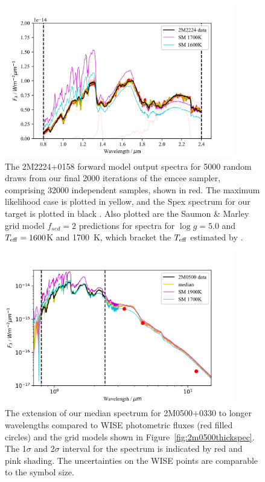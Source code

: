 \documentclass[useAMS,usenatbib]{mn2e}
\begin{document}
\begin{figure}
\hspace{-0.8cm}\includegraphics[width=285pt]{2M2224_spag_spec_ucl.png}
\caption{ The 2M2224+0158 forward model output spectra for 5000 random draws from our final 2000 iterations of the {\sc emcee} sampler, comprising 32000 independent samples, shown in red. The maximum likelihood case is plotted in yellow, and the Spex spectrum for our target is plotted in black \citep{burgasser2010a}. Also plotted are the Saumon \& Marley grid model $f_{sed} = 2$ predictions for spectra for $\log g = 5.0$ and $T_{\rm eff} = 1600$K and 1700~K, which bracket the $T_{\rm eff}$ estimated by \citet{filippazzo2015}.
\label{fig:2m2224thickspec}}
\end{figure}

\begin{figure}
\hspace{-0.8cm}\includegraphics[width=285pt]{2M0500_spag_EXT_LOG_ucl.png}
\caption{The extension of our median spectrum for 2M0500+0330 to longer wavelengths compared to WISE photometric fluxes (red filled circles) and the grid models shown in Figure~\ref{fig:2m0500thickspec}. The 1$\sigma$ and 2$\sigma$ interval for the spectrum is indicated by red and pink shading. The uncertainties on the WISE points are comparable to the symbol size.  
\label{fig:longspec1}}
\end{figure}
\end{document}
